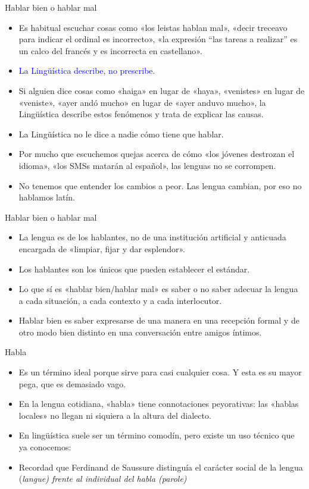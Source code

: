 \documentclass[handout]{beamer}
\begin{document}
\begin{frame}{Hablar bien o hablar mal}
\begin{itemize}
	\item Es habitual escuchar cosas como «los leistas hablan mal», «decir treceavo para indicar el ordinal es incorrecto», «la expresión ``las tareas a realizar'' es un calco del francés y es incorrecta en castellano».
	\item \textcolor{blue}{La Lingüística describe, no prescribe}. 
	\item Si alguien dice cosas como «haiga» en lugar de «haya», «venistes» en lugar de «veniste», «ayer andó mucho» en lugar de «ayer anduvo mucho», la Lingüística describe estos fenómenos y trata de explicar las causas.
	\item La Lingüística no le dice a nadie cómo tiene que hablar.
	\item Por mucho que escuchemos quejas acerca de cómo «los jóvenes destrozan el idioma», «los SMSs matarán al español», las lenguas no se corrompen.
	\item No tenemos que entender los cambios a peor. Las lengua cambian, por eso no hablamos latín.
\end{itemize}

\end{frame}

\begin{frame}{Hablar bien o hablar mal}
\begin{itemize}
	\item La lengua es de los hablantes, no de una institución artificial y anticuada encargada de «limpiar, fijar y dar esplendor».
	\item Los hablantes son los únicos que pueden establecer el estándar. 
	\item Lo que sí es «hablar bien/hablar mal» es saber o no saber adecuar la lengua a cada situación, a cada contexto y a cada interlocutor.
	\item Hablar bien es saber expresarse de una manera en una recepción formal y de otro modo bien distinto en una conversación entre amigos íntimos.
\end{itemize}

\end{frame}

\begin{frame}{Habla}
\begin{itemize}
	\item Es un término ideal porque sirve para casi cualquier cosa. Y esta es su mayor pega, que es demasiado vago.
	\item En la lengua cotidiana, «habla» tiene connotaciones peyorativas: las «hablas locales» no llegan ni siquiera a la altura del dialecto.
	\item En lingüística suele ser un término comodín, pero existe un uso técnico que ya conocemos:
	\item Recordad que Ferdinand de Saussure distinguía el carácter social de la lengua (\it{langue}) frente al individual del habla (\it{parole})
\end{itemize}

\end{frame}
\end{document}
